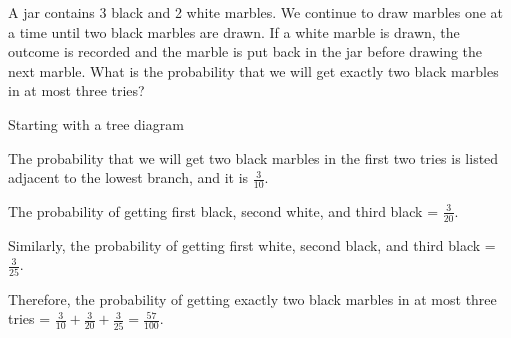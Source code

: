 \begin{example}
    A jar contains 3 black and 2 white marbles. We continue to draw marbles one at a time until two black marbles are drawn. If a white marble is drawn, the outcome is recorded and the marble is put back in the jar before drawing the next marble. What is the probability that we will get exactly two black marbles in at most three tries?
\end{example}

\begin{solution} Starting with a tree diagram

    The probability that we will get two black marbles in the first two tries is listed adjacent to the lowest branch, and it is \( \frac{3}{10} \).

    The probability of getting first black, second white, and third black = \( \frac{3}{20} \).

    Similarly, the probability of getting first white, second black, and third black = \( \frac{3}{25} \).

    Therefore, the probability of getting exactly two black marbles in at most three tries = \( \frac{3}{10} + \frac{3}{20} + \frac{3}{25} = \frac{57}{100} \).


\end{solution}

